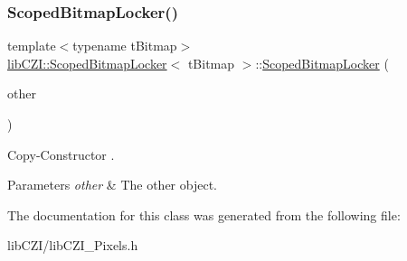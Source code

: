 \subsubsection{\texorpdfstring{Scoped\+Bitmap\+Locker()}{ScopedBitmapLocker()}\hspace{0.1cm}{\footnotesize\ttfamily [2/2]}}
{\footnotesize\ttfamily template$<$typename t\+Bitmap$>$ \\
\hyperlink{classlib_c_z_i_1_1_scoped_bitmap_locker}{lib\+C\+Z\+I\+::\+Scoped\+Bitmap\+Locker}$<$ t\+Bitmap $>$\+::\hyperlink{classlib_c_z_i_1_1_scoped_bitmap_locker}{Scoped\+Bitmap\+Locker} (\begin{DoxyParamCaption}\item[{const \hyperlink{classlib_c_z_i_1_1_scoped_bitmap_locker}{Scoped\+Bitmap\+Locker}$<$ t\+Bitmap $>$ \&}]{other }\end{DoxyParamCaption})\hspace{0.3cm}{\ttfamily [inline]}}

Copy-\/\+Constructor . 
\begin{DoxyParams}{Parameters}
{\em other} & The other object. \\
\hline
\end{DoxyParams}


The documentation for this class was generated from the following file\+:\begin{DoxyCompactItemize}
\item 
lib\+C\+Z\+I/lib\+C\+Z\+I\+\_\+\+Pixels.\+h\end{DoxyCompactItemize}
